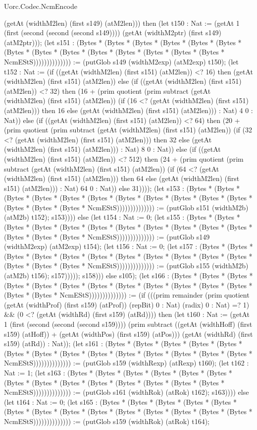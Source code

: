 \begin{lexlean}{Uorc.Codec.NcmEncode}
\begin{semanticmodule}
{(getAt (widthM2len) (first s149) (atM2len))) then (let t150 : Nat := (getAt 1 (first (second (second (second s149)))) (getAt (widthM2ptr) (first s149) (atM2ptr))); (let s151 : (Bytes * (Bytes * (Bytes * (Bytes * (Bytes * (Bytes * (Bytes * (Bytes * (Bytes * (Bytes * (Bytes * (Bytes * (Bytes * (Bytes * NcmEStS)))))))))))))) := (putGlob s149 (widthM2exp) (atM2exp) t150); (let t152 : Nat := (if ((getAt (widthM2len) (first s151) (atM2len)) <? 16) then (getAt (widthM2len) (first s151) (atM2len)) else (if ((getAt (widthM2len) (first s151) (atM2len)) <? 32) then (16 + (prim quotient (prim subtract (getAt (widthM2len) (first s151) (atM2len)) (if (16 <? (getAt (widthM2len) (first s151) (atM2len))) then 16 else (getAt (widthM2len) (first s151) (atM2len))) : Nat) 4 0 : Nat)) else (if ((getAt (widthM2len) (first s151) (atM2len)) <? 64) then (20 + (prim quotient (prim subtract (getAt (widthM2len) (first s151) (atM2len)) (if (32 <? (getAt (widthM2len) (first s151) (atM2len))) then 32 else (getAt (widthM2len) (first s151) (atM2len))) : Nat) 8 0 : Nat)) else (if ((getAt (widthM2len) (first s151) (atM2len)) <? 512) then (24 + (prim quotient (prim subtract (getAt (widthM2len) (first s151) (atM2len)) (if (64 <? (getAt (widthM2len) (first s151) (atM2len))) then 64 else (getAt (widthM2len) (first s151) (atM2len))) : Nat) 64 0 : Nat)) else 31)))); (let s153 : (Bytes * (Bytes * (Bytes * (Bytes * (Bytes * (Bytes * (Bytes * (Bytes * (Bytes * (Bytes * (Bytes * (Bytes * (Bytes * (Bytes * NcmEStS)))))))))))))) := (putGlob s151 (widthM2b) (atM2b) t152); s153)))) else (let t154 : Nat := 0; (let s155 : (Bytes * (Bytes * (Bytes * (Bytes * (Bytes * (Bytes * (Bytes * (Bytes * (Bytes * (Bytes * (Bytes * (Bytes * (Bytes * (Bytes * NcmEStS)))))))))))))) := (putGlob s149 (widthM2exp) (atM2exp) t154); (let t156 : Nat := 0; (let s157 : (Bytes * (Bytes * (Bytes * (Bytes * (Bytes * (Bytes * (Bytes * (Bytes * (Bytes * (Bytes * (Bytes * (Bytes * (Bytes * (Bytes * NcmEStS)))))))))))))) := (putGlob s155 (widthM2b) (atM2b) t156); s157))))); s158))) else s105); (let s166 : (Bytes * (Bytes * (Bytes * (Bytes * (Bytes * (Bytes * (Bytes * (Bytes * (Bytes * (Bytes * (Bytes * (Bytes * (Bytes * (Bytes * NcmEStS)))))))))))))) := (if (((prim remainder (prim quotient (getAt (widthProf) (first s159) (atProf)) (repBit) 0 : Nat) (radix) 0 : Nat) =? 1) && (0 <? (getAt (widthRd) (first s159) (atRd)))) then (let t160 : Nat := (getAt 1 (first (second (second (second s159)))) (prim subtract ((getAt (widthHoff) (first s159) (atHoff)) + (getAt (widthPos) (first s159) (atPos))) (getAt (widthRd) (first s159) (atRd)) : Nat)); (let s161 : (Bytes * (Bytes * (Bytes * (Bytes * (Bytes * (Bytes * (Bytes * (Bytes * (Bytes * (Bytes * (Bytes * (Bytes * (Bytes * (Bytes * NcmEStS)))))))))))))) := (putGlob s159 (widthRexp) (atRexp) t160); (let t162 : Nat := 1; (let s163 : (Bytes * (Bytes * (Bytes * (Bytes * (Bytes * (Bytes * (Bytes * (Bytes * (Bytes * (Bytes * (Bytes * (Bytes * (Bytes * (Bytes * NcmEStS)))))))))))))) := (putGlob s161 (widthRok) (atRok) t162); s163)))) else (let t164 : Nat := 0; (let s165 : (Bytes * (Bytes * (Bytes * (Bytes * (Bytes * (Bytes * (Bytes * (Bytes * (Bytes * (Bytes * (Bytes * (Bytes * (Bytes * (Bytes * NcmEStS)))))))))))))) := (putGlob s159 (widthRok) (atRok) t164); }
\end{semanticmodule}
\end{lexlean}
